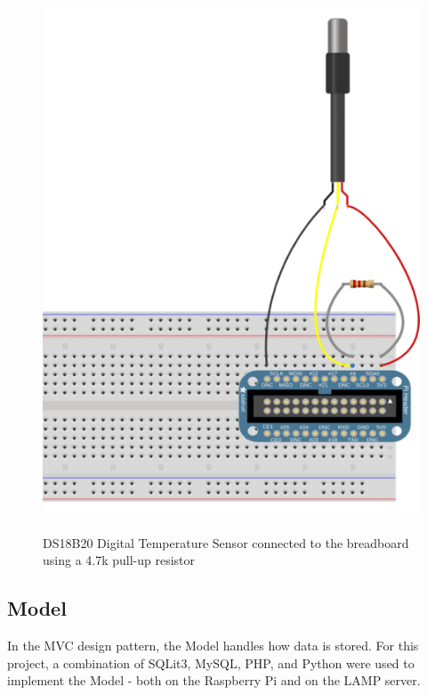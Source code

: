 \documentclass{article}
\begin{document}
				\begin{figure}[H]
  					\begin{center}	
						\includegraphics[scale=.8]{breadboard.png}\\
					\end{center}
  						\captionsetup{labelformat=empty}
  						\caption{DS18B20 Digital Temperature Sensor connected to the breadboard using a  4.7k pull-up resistor}
  				\end{figure}	
						
  	
  	\newpage	
  		\subsection{Model}		
  			In the MVC design pattern, the Model handles how data is stored. For this project, a combination of SQLit3, MySQL, PHP,
  			and Python were used to implement the Model - both on the Raspberry Pi and on the LAMP server.
\end{document}

